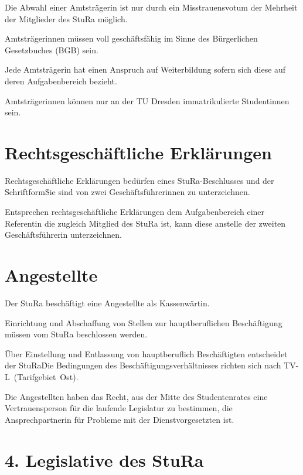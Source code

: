 \begin{multicols}{2}
\Abs \Satz Die Abwahl einer Amtsträgerin ist nur durch ein Misstrauensvotum der Mehrheit der Mitglieder des StuRa möglich.

\Abs \Satz Amtsträgerinnen müssen voll geschäftsfähig im Sinne des Bürgerlichen Gesetzbuches (BGB) sein.

\Abs \Satz Jede Amtsträgerin hat einen Anspruch auf Weiterbildung sofern sich diese auf deren Aufgabenbereich bezieht.

\Abs \Satz Amtsträgerinnen können nur an der TU Dresden immatrikulierte Studentinnen sein.



\section{Rechtsgeschäftliche Erklärungen}

\Abs \Satz Rechtsgeschäftliche Erklärungen bedürfen eines StuRa-Beschlusses und der Schriftform\. Sie sind von zwei Geschäftsführerinnen zu unterzeichnen.

\Abs \Satz Entsprechen rechtsgeschäftliche Erklärungen dem Aufgabenbereich einer Referentin die zugleich Mitglied des StuRa ist, kann diese anstelle der zweiten Geschäftsführerin unterzeichnen.



\section{Angestellte}

\Abs \Satz Der StuRa beschäftigt eine Angestellte als Kassenwärtin.

\Abs \Satz Einrichtung und Abschaffung von Stellen zur hauptberuflichen Beschäftigung müssen vom StuRa beschlossen werden.

\Abs \Satz Über Einstellung und Entlassung von hauptberuflich Beschäftigten entscheidet der StuRa\. Die Bedingungen des Beschäftigungsverhältnisses richten sich nach TV-L~(Tarifgebiet~Ost).

\Abs \Satz Die Angestellten haben das Recht, aus der Mitte des Studentenrates eine Vertrauensperson für die laufende Legislatur zu bestimmen, die Ansprechpartnerin für Probleme mit der Dienstvorgesetzten ist.


\section*{4. Legislative des StuRa}




\end{multicols}
